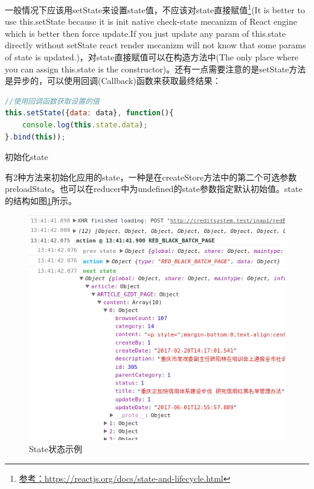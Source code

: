 \documentclass[12pt]{book}
\makeatletter
\numberwithin{dummy}{section}
\theoremstyle{ocrenumbox}
\theoremstyle{blacknumex}
\theoremstyle{blacknumbox}
\theoremstyle{ocrenum}
\renewcommand\paragraph{\@startsection{paragraph}{4}{\z@}
	{-2ex \@plus-.2ex \@minus .2ex}
	{.1ex}
	{\normalfont\small\sffamily\bfseries}}
\makeatother
\begin{document}
一般情况下应该用setState来设置state值，不应该对state直接赋值\footnote{\url{参考：https://reactjs.org/docs/state-and-lifecycle.html}}(It is better to use this.setState because it is init native check-state mecanizm of React engine which is better then force update.If you just update any param of this.state directly without setState react render mecanizm will not know that some params of state is updated.)，对state直接赋值可以在构造方法中(The only place where you can assign this.state is the constructor)。还有一点需要注意的是setState方法是异步的，可以使用回调(Callback)函数来获取最终结果：

\begin{lstlisting}[language=Javascript]
//使用回调函数获取设置的值
this.setState({data: data}, function(){
	console.log(this.state.data);
}.bind(this));
\end{lstlisting}

\paragraph{初始化state}

有2种方法来初始化应用的state，一种是在createStore方法中的第二个可选参数preloadState。也可以在reducer中为undefined的state参数指定默认初始值。state的结构如图\ref{fig:statedemo}所示。

\begin{figure}[htbp]
	\centering
	\includegraphics[scale=0.6]{statedemo.png}
	\caption{State状态示例}
	\label{fig:statedemo}
\end{figure}
\end{document}
